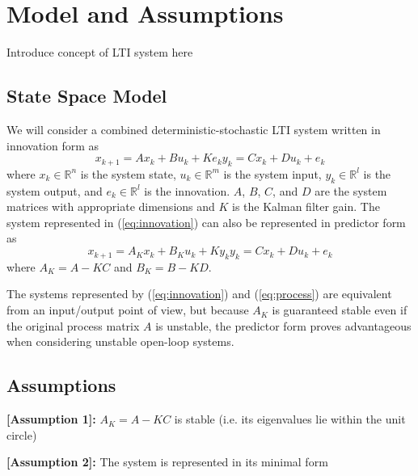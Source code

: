 \chapter{Model and Assumptions}
Introduce concept of LTI system here
\section{State Space Model}
We will consider a combined deterministic-stochastic LTI system written in innovation form as
\begin{subequations}\label{eq:innovation}
\begin{equation}x_{k+1} = Ax_k + Bu_k + Ke_k\end{equation}
\begin{equation}y_k = Cx_k + Du_k + e_k\end{equation}
\end{subequations}
where $x_k \in \mathbb{R}^n$ is the system state, $u_k \in \mathbb{R}^m$ is the system input, $y_k \in \mathbb{R}^l$ is the system output, and $e_k \in \mathbb{R}^l$ is the innovation. $A$, $B$, $C$, and $D$ are the system matrices with appropriate dimensions and $K$ is the Kalman filter gain. The system represented in (\ref{eq:innovation}) can also be represented in predictor form as
\begin{subequations}\label{eq:process}
\begin{equation}x_{k+1} = A_Kx_k + B_Ku_k + Ky_k\end{equation}
\begin{equation}y_k = Cx_k + Du_k + e_k\end{equation}
\end{subequations}
where $A_K = A-KC$ and $B_K = B-KD$.

The systems represented by (\ref{eq:innovation}) and (\ref{eq:process}) are equivalent from an input/output point of view, but because $A_K$ is guaranteed stable even if the original process matrix $A$ is unstable, the predictor form proves advantageous when considering unstable open-loop systems.

\section{Assumptions}

\textbf{[Assumption 1]:} $A_K = A - KC$ is stable (i.e. its eigenvalues lie within the unit circle)

\noindent \textbf{[Assumption 2]:} The system is represented in its minimal form